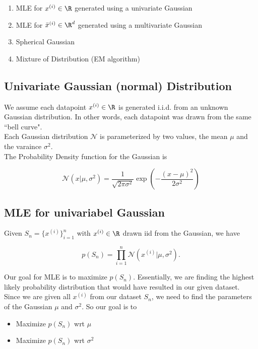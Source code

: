 \documentclass[12pt]{article}
\begin{document}
\begin{enumerate}
	\item MLE for $x^{(i)} \in \R$ generated using a univariate Gaussian
	\item MLE for $\bar x^{(i)} \in \R^d$ generated using a multivariate Gaussian
	\item Spherical Gaussian
	\item Mixture of Distribution (EM algorithm)
\end{enumerate}

\subsection{Univariate Gaussian (normal) Distribution}

We assume each datapoint $x^{(i)} \in \R$ is generated i.i.d. from an unknown Gaussian distribution. In other words, each datapoint was drawn from the same ``bell curve".\\

Each Gaussian distribution $\mathcal{N}$ is parameterized by two values, the mean $\mu$ and the varaince $\sigma^2$.\\

The Probability Density function for the Gaussian is

\[ \mathcal{N}(x | \mu, \sigma^2) = \frac 1 {\sqrt{2 \pi \sigma^2}} \exp \left(- \frac {(x - \mu)^2} {2 \sigma^2}\right) \]

\subsection{MLE for univariabel Gaussian}

Given $S_n = \{ x^{(i)} \}_{i=1}^n$ with $x^{(i)} \in \R$ drawn iid from the Gaussian, we have

\[ p(S_n) = \prod_{i=1}^n \mathcal{N}(x^{(i)}| \mu, \sigma^2). \]

Our goal for MLE is to maximize $p(S_n)$. Essentially, we are finding the highest likely probability distribution that would have resulted in our given dataset. Since we are given all $x^{(i)}$ from our dataset $S_n$, we need to find the parameters of the Gaussian $\mu$ and $\sigma^2$. So our goal is to 

\begin{itemize}
	\item Maximize $p(S_n)$ wrt $\mu$
	\item Maximize $p(S_n)$ wrt $\sigma^2$
\end{itemize}
\end{document}
